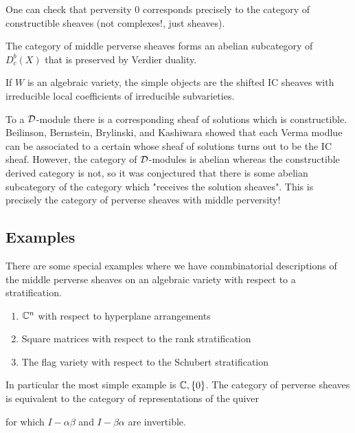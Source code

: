 \documentclass[12pt]{article}
\begin{document}
\begin{remark}
    One can check that perversity $0$ corresponds precisely to the 
    category of constructible sheaves (not complexes!, just sheaves).
\end{remark}

\begin{theorem}
    The category of middle perverse sheaves forms an abelian
    subcategory of $D^b_c(X)$ that is preserved by Verdier duality.
\end{theorem}

\begin{theorem}
    If $W$ is an algebraic variety, the simple objects 
    are the shifted IC sheaves with irreducible local coefficients of irreducible 
    subvarieties.
\end{theorem}

\begin{remark}
    To a ${\mathcal{D}}$-module there is a corresponding sheaf of solutions which 
    is constructible. Beilinson, Bernstein, Brylinski, and Kashiwara showed that
    each Verma modlue can be associated to a certain 
     whose sheaf of solutions 
    turns out to be the IC sheaf. However,
    the category of ${\mathcal{D}}$-modules is abelian whereas the constructible
    derived category is not, so it was conjectured that there is some abelian subcategory of the 
    category which "receives the solution sheaves". This is precisely
    the category of perverse sheaves with middle perversity!
\end{remark}

\subsection{Examples}
\begin{example}
There are some special examples where we have conmbinatorial descriptions of the
middle perverse sheaves on an algebraic variety with respect to a
stratification. \begin{enumerate}
    \item $\mathbb{C}^n$ with respect to hyperplane arrangements
    \item Square matrices with respect to the rank stratification
    \item The flag variety with respect to the Schubert stratification
\end{enumerate}
In particular the most simple example is $\mathbb{C}, \{0\}$. The category of perverse
sheaves is equivalent to the category of representations of the quiver \begin{center}
\end{center} for which $I-\alpha\beta$ and $I-\beta\alpha$ are invertible.
\end{example}
\end{document}
